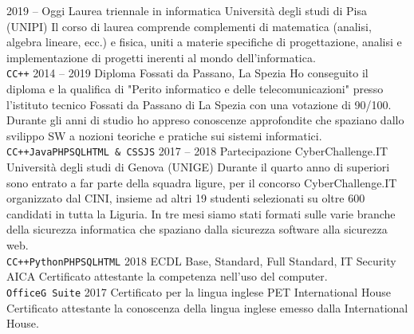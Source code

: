 \documentclass[9pt]{developercv} %
\begin{document}

\begin{entrylist}
	\entry
	{2019 -- Oggi}
	{Laurea triennale in informatica}
	{Università degli studi di Pisa (UNIPI)}
	{Il corso di laurea comprende complementi di matematica (analisi, algebra lineare, ecc.) e fisica, uniti a materie specifiche di progettazione, analisi e implementazione
		di progetti inerenti al mondo dell'informatica.\\
		\texttt{C}\slashsep\texttt{C++}}
	\entry
	{2014 -- 2019}
	{Diploma}
	{Fossati da Passano, La Spezia}
	{Ho conseguito il diploma e la qualifica di "Perito informatico e delle telecomunicazioni" presso l'istituto tecnico Fossati da Passano di La Spezia con una votazione di 90/100.
		Durante gli anni di studio ho appreso conoscenze approfondite che spaziano dallo svilippo SW a nozioni teoriche e pratiche sui sistemi informatici.\\
		\texttt{C}\slashsep\texttt{C++}\slashsep\texttt{Java}\slashsep\texttt{PHP}\slashsep\texttt{SQL}\slashsep\texttt{HTML \& CSS}\slashsep\texttt{JS}}
	\entry
	{2017 -- 2018}
	{Partecipazione CyberChallenge.IT}
	{Università degli studi di Genova (UNIGE)}
	{Durante il quarto anno di superiori sono entrato a far parte della squadra ligure, per il concorso CyberChallenge.IT organizzato dal CINI, insieme ad altri 19 studenti selezionati su oltre
		600 candidati in tutta la Liguria. In tre mesi siamo stati formati sulle varie branche della sicurezza informatica che spaziano dalla sicurezza software alla sicurezza web.\\
		\texttt{C}\slashsep\texttt{C++}\slashsep\texttt{Python}\slashsep\texttt{PHP}\slashsep\texttt{SQL}\slashsep\texttt{HTML}}
	\entry
	{2018}
	{ECDL Base, Standard, Full Standard, IT Security}
	{AICA}
	{Certificato attestante la competenza nell'uso del computer.\\
		\texttt{Office}\slashsep\texttt{G Suite}}
	\entry
	{2017}
	{Certificato per la lingua inglese PET}
	{International House}
	{Certificato attestante la conoscenza della lingua inglese emesso dalla International House.}
\end{entrylist}

\end{document}
